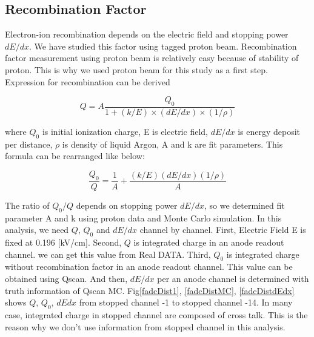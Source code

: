 \subsection{Recombination Factor}
 Electron-ion recombination depends on the electric field and stopping power $dE/dx$. We have studied this factor using tagged proton beam. Recombination factor measurement using proton beam is relatively easy because of stability of proton. This is why we used proton beam for this study as a first step.\\
  Expression for recombination can be derived 

\begin{equation}
  Q = A\frac{Q_{0}}{1+(k/E)\times(dE/dx)\times(1/\rho)}
\end{equation}

where $Q_{0}$ is initial ionization charge, E is electric field, $dE/dx$ is energy deposit per distance, $\rho$ is density of liquid Argon, A and k are fit parameters. This formula can be rearranged like below:

\begin{equation}
  \frac{Q_{0}}{Q} = \frac{1}{A}+\frac{(k/E)(dE/dx)(1/\rho)}{A}
\end{equation}

The ratio of $Q_{0}/Q$ depends on stopping power $dE/dx$, so we determined fit parameter A and k using proton data and Monte Carlo simulation. In this analysis, we need $Q$, $Q_{0}$ and $dE/dx$ channel by channel. First, Electric Field E is fixed at 0.196 [kV/cm]. Second, $Q$ is integrated charge in an anode readout channel. we can get this value from Real DATA. Third, $Q_{0}$ is integrated charge without recombination factor in an anode readout channel. This value can be obtained using Qscan. And then, $dE/dx$ per an anode channel is determined with truth information of Qscan MC. Fig\ref{fadcDist1}, \ref{fadcDistMC}, \ref{fadcDistdEdx} shows $Q$, $Q_{0}$, $dEdx$ from stopped channel -1 to stopped channel -14. In many case, integrated charge in stopped channel are composed of cross talk. This is the reason why we don't use information from stopped channel in this analysis. 

